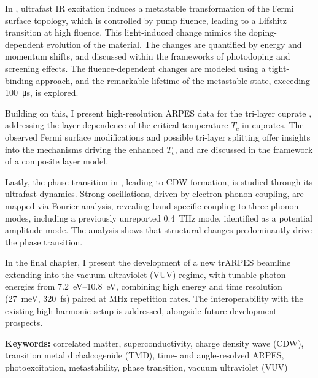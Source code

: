 In , ultrafast IR excitation induces a metastable transformation of the Fermi surface topology, which is controlled by pump fluence, leading to a Lifshitz transition at high fluence.
This light-induced change mimics the doping-dependent evolution of the material.
The changes are quantified by energy and momentum shifts, and discussed within the frameworks of photodoping and screening effects.
The fluence-dependent changes are modeled using a tight-binding approach, and the remarkable lifetime of the metastable state, exceeding \qty{100}{\micro\second}, is explored.

Building on this, I present high-resolution ARPES data for the tri-layer cuprate , addressing the layer-dependence of the critical temperature $T_c$ in cuprates.
The observed Fermi surface modifications and possible tri-layer splitting offer insights into the mechanisms driving the enhanced $T_c$, and are discussed in the framework of a composite layer model.

Lastly, the phase transition in , leading to CDW formation, is studied through its ultrafast dynamics.
Strong oscillations, driven by electron-phonon coupling, are mapped via Fourier analysis, revealing band-specific coupling to three phonon modes, including a previously unreported \qty{0.4}{\tera\hertz} mode, identified as a potential amplitude mode.
The analysis shows that structural changes predominantly drive the phase transition.

In the final chapter, I present the development of a new trARPES beamline extending into the vacuum ultraviolet (VUV) regime, with tunable photon energies from \qtyrange{7.2}{10.8}{\electronvolt}, combining high energy and time resolution (\qty{27}{\milli\electronvolt}, \qty{320}{\femto\second}) paired at \unit{\mega\hertz} repetition rates.
The interoperability with the existing high harmonic setup is addressed, alongside future development prospects.\hfill\break

\textbf{Keywords:} correlated matter, superconductivity, charge density wave (CDW), transition metal dichalcogenide (TMD), time- and angle-resolved ARPES, photoexcitation, metastability, phase transition, vacuum ultraviolet (VUV)


